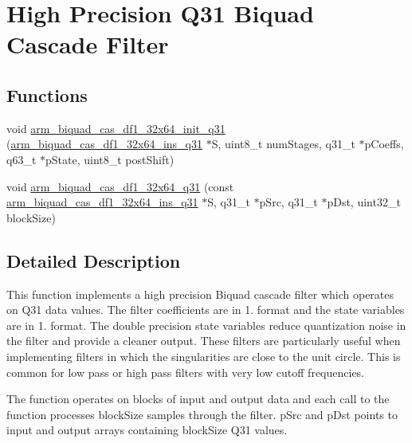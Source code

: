 \hypertarget{group___biquad_cascade_d_f1__32x64}{\section{High Precision Q31 Biquad Cascade Filter}
\label{group___biquad_cascade_d_f1__32x64}
}
\subsection*{Functions}
\begin{DoxyCompactItemize}
\item 
void \hyperlink{group___biquad_cascade_d_f1__32x64_ga44900cecb8083afcaabf905ffcd656bb}{arm\-\_\-biquad\-\_\-cas\-\_\-df1\-\_\-32x64\-\_\-init\-\_\-q31} (\hyperlink{structarm__biquad__cas__df1__32x64__ins__q31}{arm\-\_\-biquad\-\_\-cas\-\_\-df1\-\_\-32x64\-\_\-ins\-\_\-q31} $\ast$S, uint8\-\_\-t num\-Stages, q31\-\_\-t $\ast$p\-Coeffs, q63\-\_\-t $\ast$p\-State, uint8\-\_\-t post\-Shift)
\item 
void \hyperlink{group___biquad_cascade_d_f1__32x64_ga953a83e69685de6575cff37feb358a93}{arm\-\_\-biquad\-\_\-cas\-\_\-df1\-\_\-32x64\-\_\-q31} (const \hyperlink{structarm__biquad__cas__df1__32x64__ins__q31}{arm\-\_\-biquad\-\_\-cas\-\_\-df1\-\_\-32x64\-\_\-ins\-\_\-q31} $\ast$S, q31\-\_\-t $\ast$p\-Src, q31\-\_\-t $\ast$p\-Dst, uint32\-\_\-t block\-Size)
\end{DoxyCompactItemize}


\subsection{Detailed Description}
This function implements a high precision Biquad cascade filter which operates on Q31 data values. The filter coefficients are in 1. format and the state variables are in 1. format. The double precision state variables reduce quantization noise in the filter and provide a cleaner output. These filters are particularly useful when implementing filters in which the singularities are close to the unit circle. This is common for low pass or high pass filters with very low cutoff frequencies.

The function operates on blocks of input and output data and each call to the function processes {\ttfamily block\-Size} samples through the filter. {\ttfamily p\-Src} and {\ttfamily p\-Dst} points to input and output arrays containing {\ttfamily block\-Size} Q31 values.


